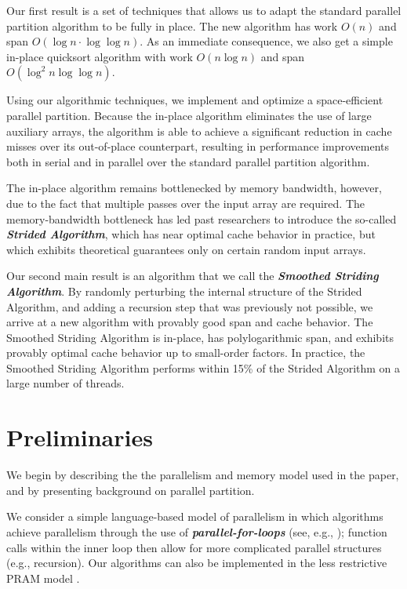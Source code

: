 \documentclass[sigplan, 10pt, nonacm]{acmart}
\newcommand{\defn}[1]{{\textit{\textbf{\boldmath #1}}}}
\renewcommand{\paragraph}[1]{\vspace{0.09in}\noindent{\bf \boldmath #1.}}
\theoremstyle{remark}
\theoremstyle{remark}
\begin{document}
Our first result is a set of techniques that allows us to adapt the
standard parallel partition algorithm to be fully in place. The new
algorithm has work $O(n)$ and span $O(\log n \cdot \log \log
n)$. As an immediate consequence, we also get a
simple in-place quicksort algorithm with work $O(n \log n)$ and span
$O(\log^2 n \log \log n)$.

Using our algorithmic techniques, we implement and optimize a
space-efficient parallel partition. Because the in-place algorithm
eliminates the use of large auxiliary arrays, the algorithm is able to
achieve a significant reduction in cache misses over its out-of-place
counterpart, resulting in performance improvements both in serial and
in parallel over the standard parallel partition algorithm.

The in-place algorithm remains bottlenecked by memory bandwidth,
however, due to the fact that multiple passes over the input array are
required. The memory-bandwidth bottleneck has led past researchers
\cite{FrancisPa92, Frias08} to introduce the so-called \defn{Strided
  Algorithm}, which has near optimal cache behavior in practice, but
which exhibits theoretical guarantees only on certain random input
arrays.

Our second main result is an algorithm that we call the \defn{Smoothed
  Striding Algorithm}. By randomly perturbing the internal structure
of the Strided Algorithm, and adding a recursion step that was
previously not possible, we arrive at a new algorithm with provably
good span and cache behavior. The Smoothed Striding Algorithm is
in-place, has polylogarithmic span, and exhibits provably optimal
cache behavior up to small-order factors. In practice, the Smoothed
Striding Algorithm performs within 15\% of the Strided Algorithm on a
large number of threads.



\section{Preliminaries}\label{secprelim}

We begin by describing the the parallelism and memory model used in
the paper, and by presenting background on parallel partition.

\paragraph{Workflow Model} We consider a simple language-based model of parallelism in which algorithms achieve parallelism through the use of \defn{parallel-for-loops} (see, e.g.,
\cite{Blelloch96,AcarBl16,CLRS}); function calls within the inner loop
then allow for more complicated parallel structures (e.g., recursion). Our algorithms can also be implemented in the less restrictive PRAM model \cite{Blelloch96, AcarBl16}.
\end{document}
